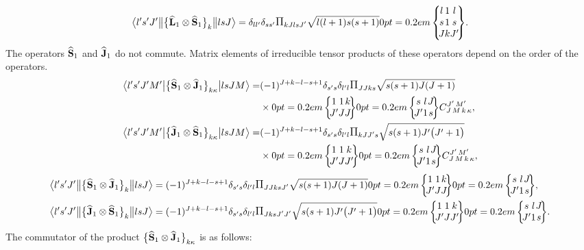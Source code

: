 \begin{equation*}
\braOketred{ l^{\prime} s^{\prime} J^{\prime}}{\bigl\{\widehat{\vect{L}}_{1} \otimes \widehat{\vect{S}}_{1}\bigr\}_{k}}{l s J}=\delta_{l l^{\prime}} \delta_{s s^{\prime}} \Fact{k J l s J^{\prime}}\sqrt{ l(l+1) s(s+1)}
\ninej{l}{1}{l}{s}{1}{s}{J}{k}{J^{\prime}}.
\end{equation*}
The operators \(\widehat{\mathbf{S}}_{1}\) and \(\widehat{\mathbf{J}}_{1}\) do not commute. Matrix elements of irreducible tensor products of these operators depend on the order of the operators.
\begin{align}
\braOket{ l^{\prime} s^{\prime} J^{\prime} M^{\prime}}{\bigl\{\widehat{\vect{S}}_{1} \otimes \widehat{\vect{J}}_{1}\bigr\}_{k \kappa}}{l s J M}= & (-1)^{J+k-l-s+1} \delta_{s^{\prime} s} \delta_{l^{\prime} l}\Fact{J J k s} \sqrt{ s(s+1) J(J+1)}\notag \\
& \times
\sixj{1}{1}{k}{J^{\prime}}{J}{J}
\sixj{s}{l}{J}{J^{\prime}}{1}{s} 
\clebsch{J}{M}{k}{\kappa}{J^{\prime}}{M^{\prime}},  \label{eq:13:2:100}\\
\braOket{ l^{\prime} s^{\prime} J^{\prime} M^{\prime}}{\bigl\{\widehat{\vect{J}}_{1} \otimes \widehat{\vect{S}}_{1}\bigr\}_{k \kappa}}{l s J M}= & (-1)^{J+k-l-s+1} \delta_{s^{\prime} s} \delta_{l^{\prime} l} \Fact{k J J^\prime s}\sqrt{s(s+1) J^{\prime}\bigl(J^{\prime}+1\bigr)}\notag \\
& \times 
\sixj{1}{1}{k}{J^{\prime}}{J}{J^{\prime}}
\sixj{s}{l}{J}{J^{\prime}}{1}{s}
\clebsch{J}{M}{k}{\kappa}{J^{\prime}}{M^{\prime}}, \label{eq:13:2:101}
\end{align}
\begin{align*}
\braOketred{ l^{\prime} s^{\prime} J^{\prime}}{\bigl\{\widehat{\vect{S}}_{1} \otimes \widehat{\vect{J}}_{1}\bigr\}_{k}}{l s J}&=(-1)^{J+k-l-s+1} \delta_{s^{\prime} s} \delta_{l^{\prime} l}\Fact{J J k s J^{\prime}} \sqrt{ s(s+1) J(J+1)} 
\sixj{1}{1}{k}{J^{\prime}}{J}{J}
\sixj{s}{l}{J}{J^{\prime}}{1}{s},\\
\braOketred{ l^{\prime} s^{\prime} J^{\prime}}{\bigl\{\widehat{\vect{J}}_{1} \otimes \widehat{\vect{S}}_{1}\bigr\}_{k}}{l s J}&=(-1)^{J+k-l-s+1} \delta_{s^{\prime} s} \delta_{l^{\prime} l} \Fact{J k s J^\prime J^{\prime}}\sqrt{ s(s+1)J^{\prime}\bigl(J^{\prime}+1\bigr)} %
\sixj{1}{1}{k}{J^{\prime}}{J}{J^{\prime}}
\sixj{s}{l}{J}{J^{\prime}}{1}{s} .
\end{align*}
The commutator of the product \(\bigl\{\widehat{\mathbf{S}}_{1} \otimes \widehat{\mathbf{J}}_{1}\bigr\}_{k \kappa}\) is as follows:

